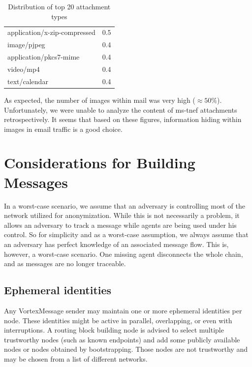 \begin{table}[H]
\begin{tabular}{l|r}
		application/x-zip-compressed                                                &    0.5\\
		image/pjpeg                                                                 &    0.4\\
		application/pkcs7-mime                                                      &    0.4\\
		video/mp4                                                                   &    0.4\\
		text/calendar                                                               &    0.4\\\hline
	\end{tabular}
	\caption{Distribution of top 20 attachment types}
	\label{tab:emailAttachments}
\end{table}

As expected, the number of images within mail was very high ($\approx 50\%$). Unfortunately, we were unable to analyze the content of ms-tnef attachments retrospectively. It seems that based on these figures, information hiding within images in email traffic is a good choice.

\section{Considerations for Building Messages}
In a worst-case scenario, we assume that an adversary is controlling most of the network utilized for anonymization. While this is not necessarily a problem, it allows an adversary to track a message while agents are being used under his control. So for simplicity and as a worst-case assumption, we always assume that an adversary has perfect knowledge of an associated message flow. This is, however, a worst-case scenario. One missing agent disconnects the whole chain, and as messages are no longer traceable.

\subsection{Ephemeral identities}
Any VortexMessage sender may maintain one or more ephemeral identities per node. These identities might be active in parallel, overlapping, or even with interruptions. A routing block building node is advised to select multiple trustworthy nodes (such as known endpoints) and add some publicly available nodes or nodes obtained by bootstrapping. Those nodes are not trustworthy and may be chosen from a list of different networks.

